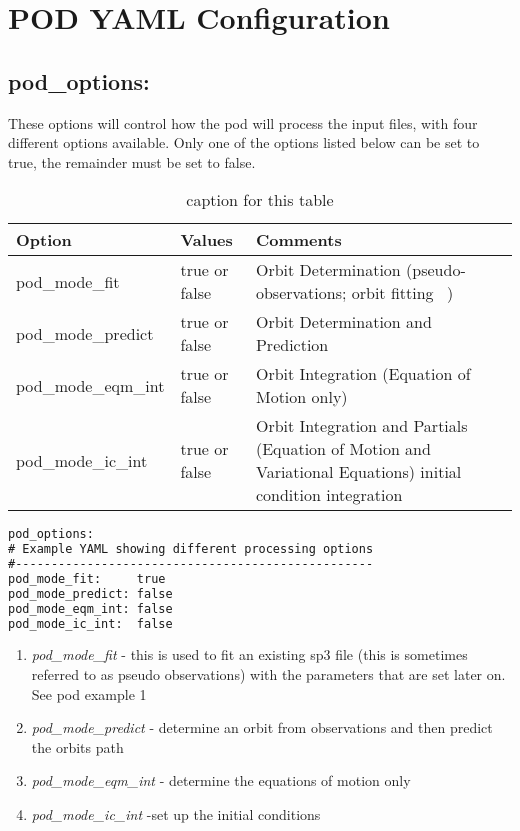 \chapter{POD YAML Configuration}
\label{ch:pod_yaml_configuration}
\section{pod\_options:}
%
These options will control how the pod will process the input files, with four different options available. Only one of the options listed below can be set to true, the remainder must be set to false.\\
\begin{table}[h!]
\begin{tabular}{|p{2.5cm}|p{2.5cm}|p{5cm}|}
	\hline
    Option & Values & Comments \\
    \hline
	pod\_mode\_fit & true or false & Orbit Determination (pseudo-observations; orbit fitting \ ) \\
	pod\_mode\_predict & true or false & Orbit Determination and Prediction \\
	pod\_mode\_eqm\_int & true or false & Orbit Integration (Equation of Motion only) \\
	pod\_mode\_ic\_int & true or false & Orbit Integration and Partials (Equation of Motion and Variational Equations) initial condition integration \\
	\hline
\end{tabular}
\caption{caption for this table}
\label{table:label_name}
\end{table}
%
\begin{lstlisting}[language=xml]
pod_options:
# Example YAML showing different processing options
#--------------------------------------------------
pod_mode_fit:     true   
pod_mode_predict: false  
pod_mode_eqm_int: false  
pod_mode_ic_int:  false  
\end{lstlisting}
%
\begin{enumerate}
	\item \emph{pod\_mode\_fit} - this is used to fit an existing sp3 file (this is sometimes referred to as pseudo observations) with the parameters that are set later on. See pod example 1
	\item \emph{pod\_mode\_predict} - determine an orbit from observations and then predict the orbits path
	\item \emph{pod\_mode\_eqm\_int} - determine the equations of motion only
	\item \emph{pod\_mode\_ic\_int} -set up the initial conditions
\end{enumerate}

